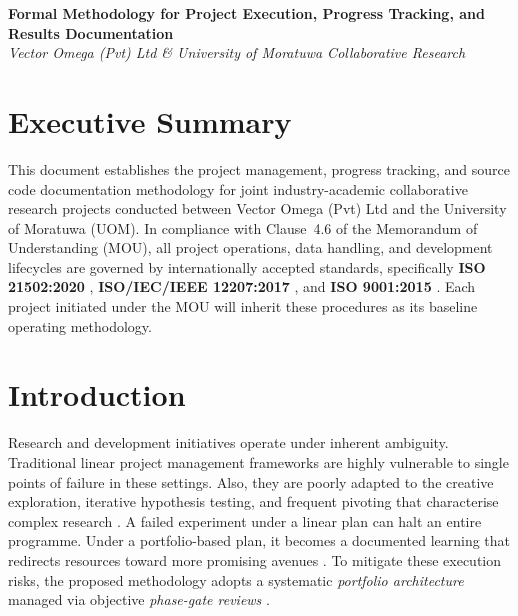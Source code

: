 \documentclass[11pt, a4paper]{article}
\begin{document}
\begin{center}
    {\Large \textbf{Formal Methodology for Project Execution, Progress Tracking, and Results Documentation}}\\[1.5em]
    {\normalsize \textit{Vector Omega (Pvt) Ltd \& University of Moratuwa Collaborative Research}}
\end{center}
\vspace{1em}



\section{Executive Summary}\label{sec:exec_sum}

This document establishes the project management, progress tracking, and source code documentation methodology for joint industry-academic collaborative research projects conducted between Vector Omega (Pvt) Ltd and the University of Moratuwa (UOM). In compliance with Clause~4.6 of the Memorandum of Understanding (MOU), all project operations, data handling, and development lifecycles are governed by internationally accepted standards, specifically \textbf{ISO 21502:2020} \cite{iso21502_2020}, \textbf{ISO/IEC/IEEE 12207:2017} \cite{iso_iec_ieee_12207_2017}, and \textbf{ISO 9001:2015} \cite{iso9001_2015}. Each project initiated under the MOU will inherit these procedures as its baseline operating methodology.

\section{Introduction}\label{sec:intro}

Research and development initiatives operate under inherent ambiguity. Traditional linear project management frameworks are highly vulnerable to single points of failure in these settings. Also, they are poorly adapted to the creative exploration, iterative hypothesis testing, and frequent pivoting that characterise complex research \cite{marle2015limits, Jetter2015, wingate2025project}. A failed experiment under a linear plan can halt an entire programme. Under a portfolio-based plan, it becomes a documented learning that redirects resources toward more promising avenues \cite{wingate2025project}. To mitigate these execution risks, the proposed methodology adopts a systematic \emph{portfolio architecture} \cite{iso21502_2020} managed via objective \emph{phase-gate reviews} \cite{cooper2010stage, cooper2017idea, iso21502_2020}. 
\end{document}
